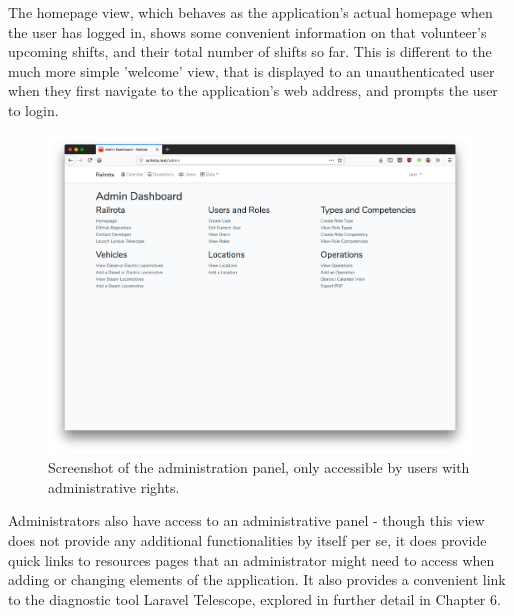 The homepage view, which behaves as the application's actual homepage when the user has logged in, shows some convenient information on that volunteer's upcoming shifts, and their total number of shifts so far. This is different to the much more simple 'welcome' view, that is displayed to an unauthenticated user when they first navigate to the application's web address, and prompts the user to login.

\begin{figure}[!ht]
    \centering
    \includegraphics[width=1.0\textwidth]{Figures/screenshot-admin}
    \caption{Screenshot of the administration panel, only accessible by users with administrative rights.}
    \label{fig:adminpanel}
\end{figure}

Administrators also have access to an administrative panel - though this view does not provide any additional functionalities by itself per se, it does provide quick links to resources pages that an administrator might need to access when adding or changing elements of the application. It also provides a convenient link to the diagnostic tool Laravel Telescope, explored in further detail in Chapter 6.